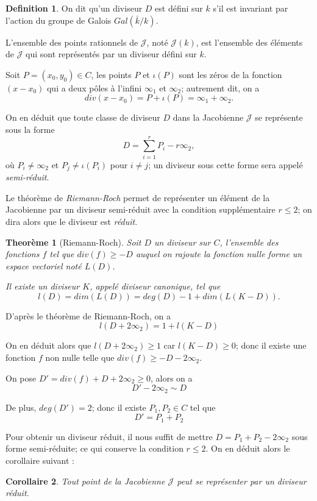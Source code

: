 \documentclass[a4paper,12pt]{article}
\newtheorem{theoreme}{Theorème}[section]
\newtheorem{corollaire}[theoreme]{Corollaire}
\theoremstyle{definition}
\newtheorem{definition}{Definition}[section]
\theoremstyle{remark}
\numberwithin{equation}{section}
\begin{document}
\begin{definition}
On dit qu'un diviseur $D$ est défini sur $k$ s'il est invariant par l'action du groupe de Galois $Gal(\bar{k}/k)$.

L'ensemble des points rationnels de $\mathcal{J}$, noté $\mathcal{J}(k)$, est l'ensemble des éléments de $\mathcal{J}$ qui sont représentés par un diviseur défini sur $k$.
\end{definition}

Soit $P=(x_0,y_0) \in C$, les points $P$ et $\iota(P)$ sont les zéros de la fonction $(x-x_0)$ qui a deux pôles à l'infini $\infty_1$ et $\infty_2$; autrement dit, on a
$$div(x-x_0) = P + \iota(P) = \infty_1 + \infty_2.$$

On en déduit que toute classe de diviseur $D$ dans la Jacobienne $\mathcal{J}$ se représente sous la forme
$$D = \sum_{i=1}^r{P_i} - r\infty_2,$$
où $P_i \neq \infty_2$ et $P_j \neq \iota(P_i)$ pour $i \neq j$; un diviseur sous cette forme sera appelé \emph{semi-réduit}.

Le théorème de \emph{Riemann-Roch} permet de représenter un élément de la Jacobienne par un diviseur semi-réduit avec la condition supplémentaire $r \leq 2$; on dira alors que le diviseur est \emph{réduit}.
\begin{theoreme}[Riemann-Roch]
Soit $D$ un diviseur sur $C$, l'ensemble des fonctions $f$ tel que $div(f) \geq -D$ auquel on rajoute la fonction nulle forme un espace vectoriel noté $L(D)$.

Il existe un diviseur $K$, appelé diviseur canonique, tel que
$$l(D) = dim (L(D)) = deg(D) - 1 + dim (L(K - D)).$$
\end{theoreme}

D'après le théorème de Riemann-Roch, on a
$$l(D+2\infty_2) = 1 + l(K-D)$$

On en déduit alors que $l(D+2\infty_2) \geq 1$ car $l(K-D) \geq 0$; donc il existe une fonction $f$ non nulle telle que $div(f) \geq -D - 2\infty_2$.

On pose $D' = div(f) + D + 2\infty_2 \geq 0$, alors on a
$$D' - 2\infty_2 \sim D$$

De plus, $deg(D') = 2$; donc il existe $P_1, P_2 \in C$ tel que
$$D' = P_1 + P_2$$

Pour obtenir un diviseur réduit, il nous suffit de mettre $D = P_1 + P_2 - 2\infty_2$ sous forme semi-réduite; ce qui conserve la condition $r \leq 2$. On en déduit alors le corollaire suivant :

\begin{corollaire}
\label{div_red}
Tout point de la Jacobienne $\mathcal{J}$ peut se représenter par un diviseur réduit.
\end{corollaire}
\end{document}
